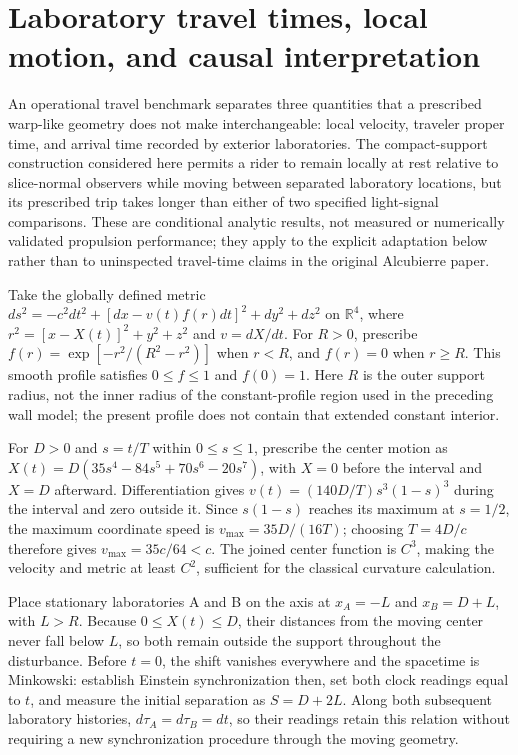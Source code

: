 \documentclass[11pt]{article}
\begin{document}
\section{Laboratory travel times, local motion, and causal interpretation}
An operational travel benchmark separates three quantities that a prescribed warp-like geometry does not make interchangeable: local velocity, traveler proper time, and arrival time recorded by exterior laboratories. The compact-support construction considered here permits a rider to remain locally at rest relative to slice-normal observers while moving between separated laboratory locations, but its prescribed trip takes longer than either of two specified light-signal comparisons. These are conditional analytic results, not measured or numerically validated propulsion performance; they apply to the explicit adaptation below rather than to uninspected travel-time claims in the original Alcubierre paper.

Take the globally defined metric $ds^2=-c^2dt^2+[dx-v(t)f(r)dt]^2+dy^2+dz^2$ on $\mathbb{R}^4$, where $r^2=[x-X(t)]^2+y^2+z^2$ and $v=dX/dt$. For $R>0$, prescribe $f(r)=\exp[-r^2/(R^2-r^2)]$ when $r<R$, and $f(r)=0$ when $r\geq R$. This smooth profile satisfies $0\leq f\leq1$ and $f(0)=1$. Here $R$ is the outer support radius, not the inner radius of the constant-profile region used in the preceding wall model; the present profile does not contain that extended constant interior.

For $D>0$ and $s=t/T$ within $0\leq s\leq1$, prescribe the center motion as $X(t)=D(35s^4-84s^5+70s^6-20s^7)$, with $X=0$ before the interval and $X=D$ afterward. Differentiation gives $v(t)=(140D/T)s^3(1-s)^3$ during the interval and zero outside it. Since $s(1-s)$ reaches its maximum at $s=1/2$, the maximum coordinate speed is $v_{\max}=35D/(16T)$; choosing $T=4D/c$ therefore gives $v_{\max}=35c/64<c$. The joined center function is $C^3$, making the velocity and metric at least $C^2$, sufficient for the classical curvature calculation.

Place stationary laboratories A and B on the axis at $x_A=-L$ and $x_B=D+L$, with $L>R$. Because $0\leq X(t)\leq D$, their distances from the moving center never fall below $L$, so both remain outside the support throughout the disturbance. Before $t=0$, the shift vanishes everywhere and the spacetime is Minkowski: establish Einstein synchronization then, set both clock readings equal to $t$, and measure the initial separation as $S=D+2L$. Along both subsequent laboratory histories, $d\tau_A=d\tau_B=dt$, so their readings retain this relation without requiring a new synchronization procedure through the moving geometry.
\end{document}
